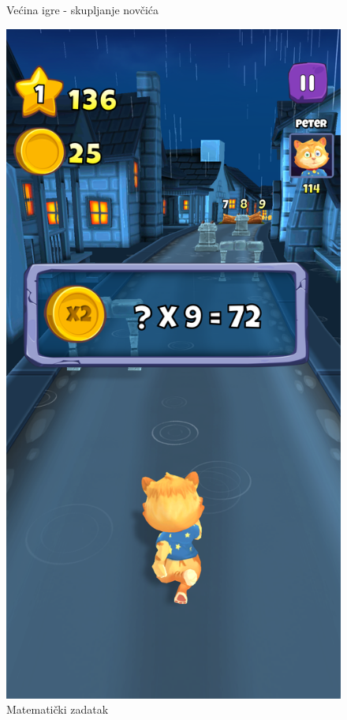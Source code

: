 \documentclass[times, utf8, zavrsni, numeric]{fer}
\begin{document}
\begin{figure}[!htb]
\begin{minipage}{0.48\textwidth}
			\caption{Većina igre - skupljanje novčića}
			\label{fig:skupljewnjenovcica}
		\end{minipage}\hfill
		\begin{minipage}{0.48\textwidth}
			\centering
			\includegraphics[scale=0.15]{"slike/igre/toonmath2.png"} 
			\caption{Matematički zadatak}
			\label{fig:toonmathmath}
		\end{minipage}
	\end{figure}
 
\end{document}
